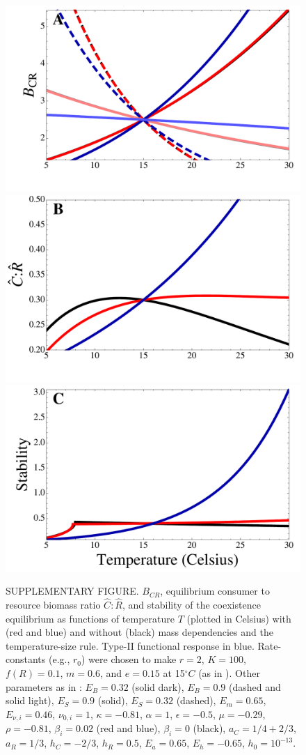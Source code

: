 \documentclass[11pt]{article}
\begin{document}
\begin{figure}[!ht]
\centering
\includegraphics[width=0.5\linewidth]{BCRTypeII}
\includegraphics[width=0.5\linewidth]{CtoRTypeII}
\includegraphics[width=0.5\linewidth]{StabilityTypeII}
\caption{
SUPPLEMENTARY FIGURE.
$B_{CR}$, equilibrium consumer to resource biomass ratio $\hat{C}:\hat{R}$, and stability of the coexistence equilibrium as functions of temperature $T$ (plotted in Celsius) with (red and blue) and without (black) mass dependencies and the temperature-size rule.
Type-II functional response in blue.
Rate-constants (e.g., $r_0$) were chosen to make $r = 2$, $K = 100$, $f(R) = 0.1$, $m = 0.6$, and $e = 0.15$ at 15$^\circ C$ (as in \cite{Gilbert2014}).
Other parameters as in \cite{Gilbert2014,DeLong2015,Rall2012}: $E_B = 0.32$ (solid dark), $E_B = 0.9$ (dashed and solid light), $E_S = 0.9$ (solid), $E_S = 0.32$ (dashed), $E_m = 0.65$, $E_{\nu,i} = 0.46$, $\nu_{0,i} = 1$, $\kappa = -0.81$, $\alpha = 1$, $\epsilon = -0.5$, $\mu = -0.29$, $\rho = -0.81$, $\beta_i = 0.02$ (red and blue), $\beta_i = 0$ (black), $a_C = 1/4+2/3$, $a_R = 1/3$, $h_C = -2/3$, $h_R = 0.5$, $E_a = 0.65$, $E_h = -0.65$, $h_0 = 10^{-13}$.  
}
\label{TypeII}
\end{figure}
\end{document}
